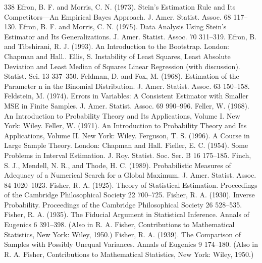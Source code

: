 \begin{thebibliography}{338}
\label{bib:source112} Efron, B. F. and Morris, C. N. (1973). Stein’s Estimation Rule and Its Competitors—An Empirical Bayes Approach. J. Amer. Statist. Assoc. 68 117–130.
\label{bib:source113} Efron, B. F. and Morris, C. N. (1975). Data Analysis Using Stein’s Estimator and Its Generalizations. J. Amer. Statist. Assoc. 70 311–319.
\label{bib:source114} Efron, B. and Tibshirani, R. J. (1993). An Introduction to the Bootstrap. London: Chapman and Hall..
\label{bib:source115} Ellis, S. Instability of Least Squares, Least Absolute Deviation and Least Median of Squares Linear Regression (with discussion). Statist. Sci. 13 337–350.
\label{bib:source116} Feldman, D. and Fox, M. (1968). Estimation of the Parameter n in the Binomial Distribution. J. Amer. Statist. Assoc. 63 150–158.
\label{bib:source117} Feldstein, M. (1974). Errors in Variables: A Consistent Estimator with Smaller MSE in Finite Samples. J. Amer. Statist. Assoc. 69 990–996.
\label{bib:source118} Feller, W. (1968). An Introduction to Probability Theory and Its Applications, Volume I. New York: Wiley.
\label{bib:source119} Feller, W. (1971). An Introduction to Probability Theory and Its Applications, Volume II. New York: Wiley.
\label{bib:source120} Ferguson, T. S. (1996). A Course in Large Sample Theory. London: Chapman and Hall.
\label{bib:source121} Fieller, E. C. (1954). Some Problems in Interval Estimation. J. Roy. Statist. Soc. Ser. B 16 175–185.
\label{bib:source122} Finch, S. J., Mendell, N. R., and Thode, H. C. (1989). Probabilistic Measures of Adequacy of a Numerical Search for a Global Maximum. J. Amer. Statist. Assoc. 84 1020–1023.
\label{bib:source123} Fisher, R. A. (1925). Theory of Statistical Estimation. Proceedings of the Cambridge Philosophical Society 22 700–725.
\label{bib:source124} Fisher, R. A. (1930). Inverse Probability. Proceedings of the Cambridge Philosophical Society 26 528–535.
\label{bib:source125} Fisher, R. A. (1935). The Fiducial Argument in Statistical Inference. Annals of Eugenics 6 391–398. (Also in R. A. Fisher, Contributions to Mathematical Statistics, New York: Wiley, 1950.)
\label{bib:source126} Fisher, R. A. (1939). The Comparison of Samples with Possibly Unequal Variances. Annals of Eugenics 9 174–180. (Also in R. A. Fisher, Contributions to Mathematical Statistics, New York: Wiley, 1950.)

\end{thebibliography}
